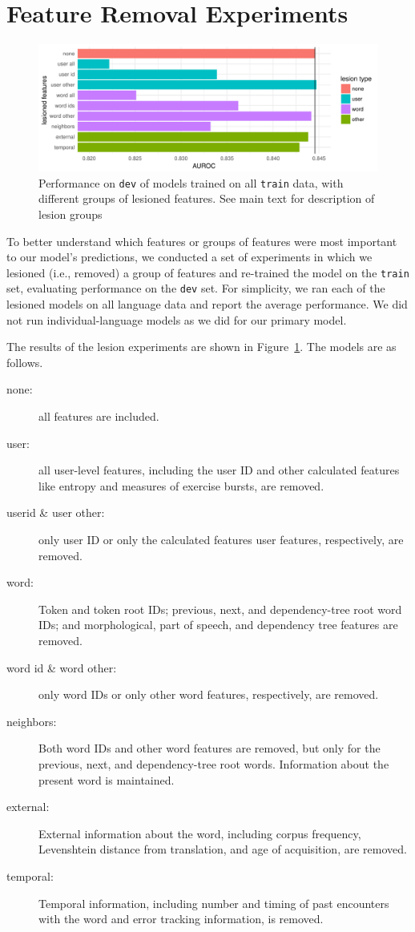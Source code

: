 \documentclass[11pt,a4paper]{article}
\begin{document}
\section{Feature Removal Experiments}

\begin{figure}[htp]
\includegraphics[width=\textwidth]{lesions.pdf}
\caption{Performance on {\tt dev} of models trained on all {\tt train} data,
  with different groups of lesioned features. See main text for description of
  lesion groups}
\label{fig:lesions}
\end{figure}


To better understand which features or groups of features were most important to
our model's predictions, we conducted a set of experiments in which we lesioned
(i.e., removed) a group of features and re-trained the model on the {\tt train}
set, evaluating performance on the {\tt dev} set. For simplicity, we ran each of the
lesioned models on all language data and report the average
performance. We did not run individual-language models as we did for our primary model.

The results of the lesion experiments are shown in Figure~\ref{fig:lesions}. The
models are as follows.
\begin{description}
  \item[none:] all features are included.  
  \item[user:] all user-level features, including the user ID and other
    calculated features like entropy and measures of exercise bursts, are
    removed.
  \item[userid \& user other:] only user ID or only the calculated
    features user features, respectively, are removed.
  \item[word:] Token and token root IDs; previous, next, and dependency-tree
    root word IDs; and morphological, part of speech, and dependency tree
    features are removed.
  \item[word id \& word other:] only word IDs or only other
    word features, respectively, are removed.
  \item[neighbors:] Both word IDs and other word features are removed, but
    only for the previous, next, and dependency-tree root words. Information
    about the present word is maintained.
  \item[external:] External information about the word, including corpus
    frequency, Levenshtein distance from translation, and age of acquisition,
    are removed.
  \item[temporal:] Temporal information, including number and timing of
    past encounters with the word and error tracking information, is removed.
\end{description}
\end{document}
